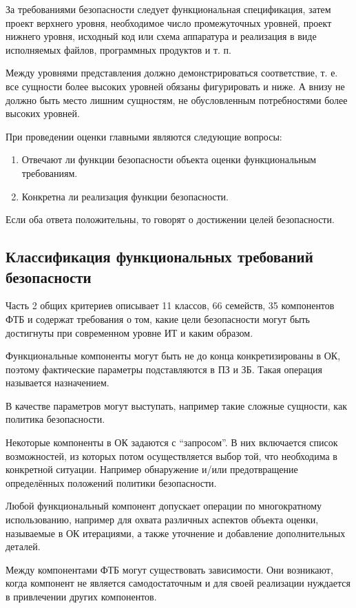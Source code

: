 \documentclass[12pt, russian, oneside, article]{ncc}
\begin{document}
За требованиями безопасности следует функциональная спецификация, затем проект верхнего уровня, необходимое число промежуточных уровней, проект нижнего уровня, исходный код или схема аппаратура и реализация в виде исполняемых файлов, программных продуктов и т. п.

Между уровнями представления должно демонстрироваться соответствие, т. е. все сущности более высоких уровней обязаны фигурировать и ниже. А внизу не должно быть место лишним сущностям, не обусловленным потребностями более высоких уровней.

При проведении оценки главными являются следующие вопросы:
\begin{enumerate}
\item Отвечают ли функции безопасности объекта оценки функциональным требованиям.
\item Конкретна ли реализация функции безопасности.
\end{enumerate}

Если оба ответа положительны, то говорят о достижении целей безопасности.
\subsection{Классификация функциональных требований безопасности}
\label{sec-3_2}


Часть 2 общих критериев описывает 11 классов, 66 семейств, 35 компонентов ФТБ и содержат требования о том, какие цели безопасности могут быть достигнуты при современном уровне ИТ и каким образом.

Функциональные компоненты могут быть не до конца конкретизированы в ОК, поэтому фактические параметры подставляются в ПЗ и ЗБ. Такая операция называется назначением.

В качестве параметров могут выступать, например такие сложные сущности, как политика безопасности.

Некоторые компоненты в ОК задаются с ``запросом''. В них включается список возможностей, из которых потом осуществляется выбор той, что необходима в конкретной ситуации. Например обнаружение и/или предотвращение определённых положений политики безопасности.

Любой функциональный компонент допускает операции по многократному использованию, например для охвата различных аспектов объекта оценки, называемые в ОК итерациями, а также уточнение и добавление дополнительных деталей.

Между компонентами ФТБ могут существовать зависимости. Они возникают, когда компонент не является самодостаточным и для своей реализации нуждается в привлечении других компонентов.
\end{document}
